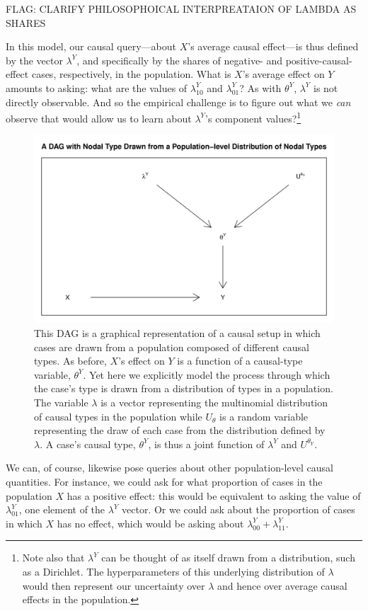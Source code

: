 \documentclass[
  12pt,
]{book}
\begin{document}
FLAG: CLARIFY PHILOSOPHOICAL INTERPREATAION OF LAMBDA AS SHARES

In this model, our causal query---about \(X\)'s average causal effect---is thus defined by the vector \(\lambda^Y\), and specifically by the shares of negative- and positive-causal-effect cases, respectively, in the population. What is \(X\)'s average effect on \(Y\) amounts to asking: what are the values of \(\lambda^Y_{10}\) and \(\lambda^Y_{01}\)? As with \(\theta^Y\), \(\lambda^Y\) is not directly observable. And so the empirical challenge is to figure out what we \emph{can} observe that would allow us to learn about \(\lambda^Y\)'s component values?\footnote{Note also that \(\lambda^Y\) can be thought of as itself drawn from a distribution, such as a Dirichlet. The hyperparameters of this underlying distribution of \(\lambda\) would then represent our uncertainty over \(\lambda\) and hence over average causal effects in the population.}

\begin{figure}

{\centering \includegraphics[width=.5\textwidth]{ii_files/figure-latex/DAGace-1} 

}

\caption{\label{fig:DAGace} This DAG is a graphical representation of a causal setup in which cases are drawn from a population composed of different causal types. As before, $X$'s effect on $Y$ is a function of a causal-type variable, $\theta^Y$. Yet here we explicitly model the process through which the case's type is drawn from a distribution of types in a population. The variable $\lambda$ is a vector representing the multinomial distribution of causal types in the population while $U_\theta$ is a random variable representing the draw of each case from the distribution defined by $\lambda$. A case's causal type, $\theta^Y$, is thus a joint function of $\lambda^Y$ and $U^{\theta_Y}$.}\label{fig:DAGace}
\end{figure}

We can, of course, likewise pose queries about other population-level causal quantities. For instance, we could ask for what proportion of cases in the population \(X\) has a positive effect: this would be equivalent to asking the value of \(\lambda^Y_{01}\), one element of the \(\lambda^Y\) vector. Or we could ask about the proportion of cases in which \(X\) has no effect, which would be asking about \(\lambda^Y_{00} + \lambda^Y_{11}\).
\end{document}
